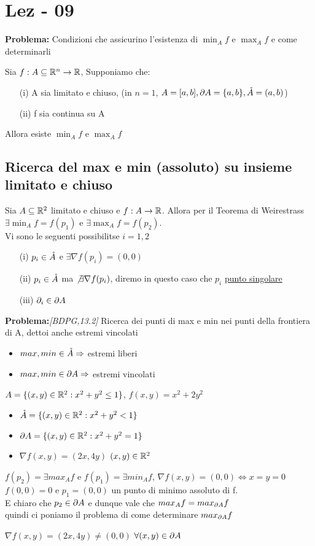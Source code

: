 \section{Lez - 09}
\textbf{Problema:} Condizioni che assicurino l'esistenza di $\min_{A}f$ e $\max_{A}f$ e come determinarli
\begin{theorem}[Weirestrass][BDPG,10.10]
  Sia $f: A \subseteq \mathbb{R}^n \to \mathbb{R}$, Supponiamo che:
  \begin{itemize}
    \item[(i)] A sia limitato e chiuso, (in $n=1$, $A = [a,b], \partial A = \{a,b\}, \mathring{A} = (a,b)$)
    \item[(ii)] f sia continua su A 
  \end{itemize}
  Allora esiste $\min_{A}f$ e $\max_{A}f$
\end{theorem}
\subsection{Ricerca del max e min (assoluto) su insieme limitato e chiuso}
Sia $A \subseteq \mathbb{R}^2$ limitato e chiuso e $f:A \to \mathbb{R}$. Allora per il Teorema di Weirestrass 
$\exists \min_{A}f = f(p_1)$ e $\exists\max_{A}f = f(p_2)$. \\
Vi sono le seguenti possibilit\aca se $i = 1,2$
\begin{itemize}
  \item[(i)] $p_i \in \mathring{A}$ e $\exists \nabla f(p_i) = (0,0)$
  \item[(ii)] $p_i \in \mathring{A}$ ma $\not \exists \nabla f(p_i)$, diremo in questo caso che $p_i$ \ace \underline{punto singolare}
  \item[(iii)] $\partial_i \in \partial A$  
\end{itemize}
\textbf{Problema:}\textit{[BDPG,13.2]} 
 Ricerca dei punti di max e min nei punti della frontiera di A, dettoi anche estremi vincolati
\begin{itemize}
  \item $max,min \in \mathring{A} \Rightarrow $ estremi liberi
  \item $max,min \in \partial A \Rightarrow $ estremi vincolati
\end{itemize}
\begin{example}\label{para}
  $A = \{(x,y)\in \mathbb{R}^2 : x^2+y^2 \leq 1\}$, $f(x,y) = x^2+2y^2$
  \begin{itemize}
    \item $\mathring{A} = \{(x,y)\in\mathbb{R}^2 : x^2+y^2 < 1\}$
    \item $\partial A = \{(x,y)\in\mathbb{R}^2 : x^2+y^2=1\}$
    \item $\nabla f(x,y) = (2x,4y)$ $(x,y)\in\mathbb{R}^2$
  \end{itemize}
  $f(p_2) = \exists max_{A} f$ e $f(p_1) = \exists min_{A}f$, $\nabla f(x,y)=(0,0) \iff x = y = 0$ 
  $f(0,0) = 0$ e $p_1 = (0,0)$ \ace un punto di minimo assoluto di f. \\
  \ac{E} chiaro che $p_2 \in \partial A$ e dunque vale che $max_{A} f = max_{\partial A}f$ \\
  quindi ci poniamo il problema di come determinare $max_{\partial A}f$
\end{example}
\begin{osservazione}
  $\nabla f(x,y) = (2x,4y) \neq (0,0)$ $\forall (x,y) \in \partial A$
\end{osservazione}
